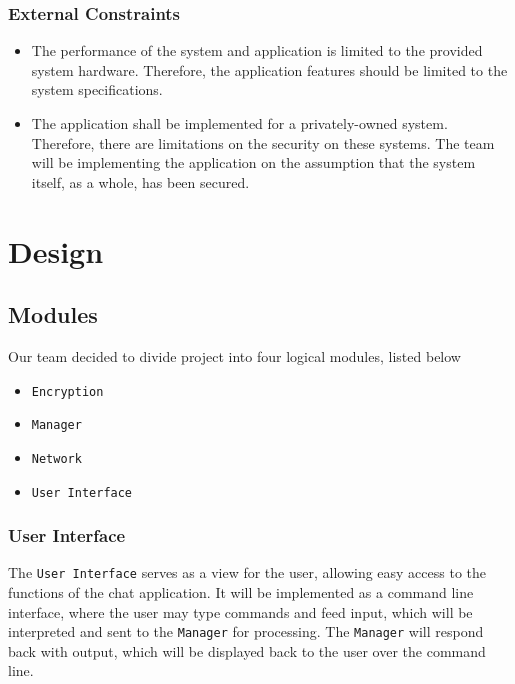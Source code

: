 \documentclass[sigconf]{acmart}
\begin{document}
\subsubsection{External Constraints}
\begin{itemize}
	\item The performance of the system and application is limited to the provided system hardware.
	      Therefore, the application features should be limited to the system specifications.
	\item The application shall be implemented for a privately-owned system. Therefore, there are
	      limitations on the security on these systems. The team will be implementing the
	      application on the assumption that the system itself, as a whole, has been secured.
\end{itemize}


\section{Design}

\subsection{Modules}
Our team decided to divide project into four logical modules, listed below
\begin{itemize}
	\item \texttt{Encryption}
	\item \texttt{Manager}
	\item \texttt{Network}
	\item \texttt{User Interface}
\end{itemize}

\subsubsection{User Interface}
The \texttt{User Interface} serves as a view for the user, allowing easy access to the functions of the chat application. It will be implemented as a command line interface, where the user may type commands and feed input, which will be interpreted and sent to the \texttt{Manager} for processing. The \texttt{Manager} will respond back with output, which will be displayed back to the user over the command line.
\end{document}
